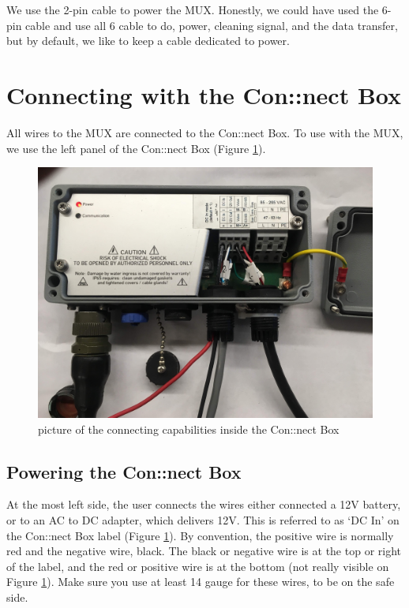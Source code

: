 \documentclass[]{book}
\begin{document}
We use the 2-pin cable to power the MUX. Honestly, we could have used the 6-pin cable and use all 6 cable to do, power, cleaning signal, and the data transfer, but by default, we like to keep a cable dedicated to power.

\hypertarget{connecting-with-the-connect-box}{%
\section{Connecting with the Con::nect Box}\label{connecting-with-the-connect-box}}

All wires to the MUX are connected to the Con::nect Box. To use with the MUX, we use the left panel of the Con::nect Box (Figure \ref{fig:connectboxfull}).

\begin{figure}

{\centering \includegraphics[width=0.7\linewidth]{pictures/ConnectBoxFull} 

}

\caption{picture of the connecting capabilities inside the Con::nect Box}\label{fig:connectboxfull}
\end{figure}

\hypertarget{powering-the-connect-box}{%
\subsection{Powering the Con::nect Box}\label{powering-the-connect-box}}

At the most left side, the user connects the wires either connected a 12V battery, or to an AC to DC adapter, which delivers 12V. This is referred to as `DC In' on the Con::nect Box label (Figure \ref{fig:connectboxfull}). By convention, the positive wire is normally red and the negative wire, black. The black or negative wire is at the top or right of the label, and the red or positive wire is at the bottom (not really visible on Figure \ref{fig:connectboxfull}). Make sure you use at least 14 gauge for these wires, to be on the safe side.
\end{document}
